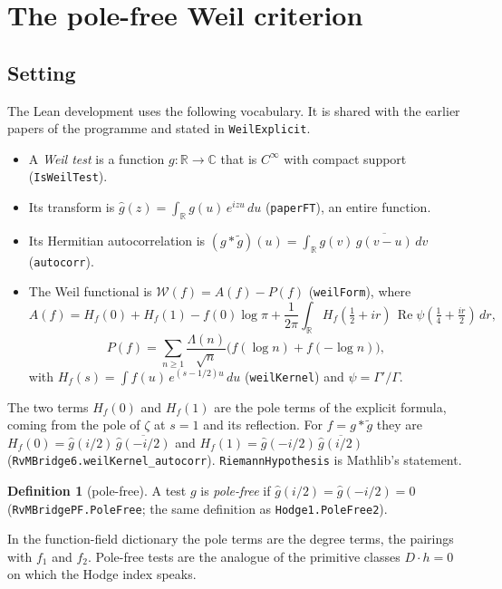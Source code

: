 \documentclass[11pt]{article}
\theoremstyle{definition}
\newtheorem{definition}[theorem]{Definition}
\newcommand{\lean}[1]{\texttt{#1}}
\newcommand{\re}{\operatorname{Re}}
\newcommand{\C}{\mathbb{C}}
\newcommand{\R}{\mathbb{R}}
\newcommand{\Weil}{\mathcal{W}}
\begin{document}
\section{The pole-free Weil criterion}\label{sec:polefree}

\subsection{Setting}

The Lean development uses the following vocabulary. It is shared with the earlier papers of the programme \cite{Murphy932,MurphyNewman} and stated in \lean{WeilExplicit}.
\begin{itemize}[leftmargin=*]
\item A \emph{Weil test} is a function $g : \R \to \C$ that is $C^\infty$ with compact support (\lean{IsWeilTest}).
\item Its transform is $\hat g(z) = \int_\R g(u)\,e^{izu}\,du$ (\lean{paperFT}), an entire function.
\item Its Hermitian autocorrelation is $(g*\tilde g)(u) = \int_\R g(v)\,\overline{g(v-u)}\,dv$ (\lean{autocorr}).
\item The Weil functional is $\Weil(f) = A(f) - P(f)$ (\lean{weilForm}), where
\[
A(f) = H_f(0) + H_f(1) - f(0)\log\pi + \frac{1}{2\pi}\int_\R H_f(\tfrac12 + ir)\,\re\psi(\tfrac14 + \tfrac{ir}{2})\,dr,
\]
\[
P(f) = \sum_{n\ge 1} \frac{\Lambda(n)}{\sqrt n}\bigl(f(\log n) + f(-\log n)\bigr),
\]
with $H_f(s) = \int f(u)\,e^{(s-1/2)u}\,du$ (\lean{weilKernel}) and $\psi = \Gamma'/\Gamma$.
\end{itemize}
The two terms $H_f(0)$ and $H_f(1)$ are the pole terms of the explicit formula, coming from the pole of $\zeta$ at $s = 1$ and its reflection. For $f = g*\tilde g$ they are $H_f(0) = \hat g(i/2)\,\overline{\hat g(-i/2)}$ and $H_f(1) = \hat g(-i/2)\,\overline{\hat g(i/2)}$ (\lean{RvMBridge6.weilKernel\_autocorr}). \lean{RiemannHypothesis} is Mathlib's statement.

\begin{definition}[pole-free]
A test $g$ is \emph{pole-free} if $\hat g(i/2) = \hat g(-i/2) = 0$ (\lean{RvMBridgePF.PoleFree}; the same definition as \lean{Hodge1.PoleFree2}).
\end{definition}

In the function-field dictionary the pole terms are the degree terms, the pairings with $f_1$ and $f_2$. Pole-free tests are the analogue of the primitive classes $D\cdot h = 0$ on which the Hodge index speaks.
\end{document}
